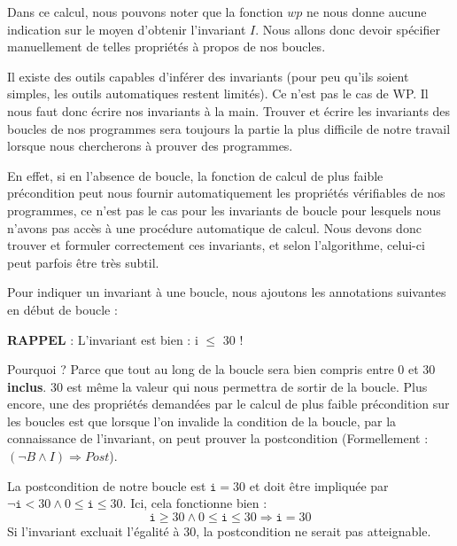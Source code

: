 Dans ce calcul, nous pouvons noter que la fonction $wp$ ne nous donne aucune
indication sur le moyen d'obtenir l'invariant $I$. Nous allons donc devoir
spécifier manuellement de telles propriétés à propos de nos boucles.





Il existe des outils capables d'inférer des invariants (pour peu qu'ils soient
simples, les outils automatiques restent limités). Ce n'est pas le cas de WP.
Il nous faut donc écrire nos invariants à la main. Trouver et écrire les
invariants des boucles de nos programmes sera toujours la partie la plus difficile
de notre travail lorsque nous chercherons à prouver des programmes.



En effet, si en l'absence de boucle, la fonction de calcul de plus faible
précondition peut nous fournir automatiquement les propriétés vérifiables de nos
programmes, ce n'est pas le cas pour les invariants de boucle pour lesquels
nous n'avons pas accès à une procédure automatique de calcul. Nous devons donc
trouver et formuler correctement ces invariants, et selon l'algorithme, celui-ci
peut parfois être très subtil.



Pour indiquer un invariant à une boucle, nous ajoutons les annotations suivantes
en début de boucle :






\begin{Warning}
\textbf{RAPPEL} : L'invariant est bien : i \textbf{$\leq$} 30 !
\end{Warning}


Pourquoi ? Parce que tout au long de la boucle  sera bien compris entre
0 et 30 \textbf{inclus}. 30 est même la valeur qui nous permettra de sortir de la
boucle. Plus encore, une des propriétés demandées par le calcul de plus faible
précondition sur les boucles est que lorsque l'on invalide la condition de la
boucle, par la connaissance de l'invariant, on peut prouver la postcondition
(Formellement : $(\neg B \wedge I) \Rightarrow Post$).



La postcondition de notre boucle est $\texttt{i} = 30$ et doit être impliquée par
$\neg \texttt{i} < 30 \wedge 0 \leq \texttt{i} \leq 30$. Ici, cela fonctionne
bien :
$$\texttt{i} \geq 30 \wedge 0 \leq \texttt{i} \leq 30 \Rightarrow \texttt{i} = 30$$
Si l'invariant excluait l'égalité à 30, la postcondition ne serait pas atteignable.




